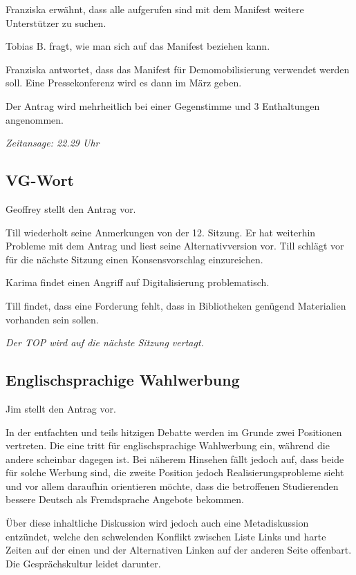 \documentclass[ngerman,headheight=70pt]{scrartcl}
\begin{document}
    Franziska erwähnt, dass alle aufgerufen sind mit dem Manifest weitere Unterstützer
    zu suchen.

    Tobias B. fragt, wie man sich auf das Manifest beziehen kann.

    Franziska antwortet, dass das Manifest für Demomobilisierung verwendet werden
    soll. Eine Pressekonferenz wird es dann im März geben.

    Der Antrag wird mehrheitlich bei einer Gegenstimme und 3 Enthaltungen
    angenommen.

    \textit{Zeitansage: 22.29 Uhr}
    \subsection{VG-Wort}

    Geoffrey stellt den Antrag vor.

    Till wiederholt seine Anmerkungen von der 12. Sitzung. Er hat weiterhin Probleme
    mit dem Antrag und liest seine Alternativversion vor. Till schlägt vor
    für die nächste Sitzung einen Konsensvorschlag einzureichen.

    Karima findet einen Angriff auf Digitalisierung problematisch.

    Till findet, dass eine Forderung fehlt, dass in Bibliotheken genügend
    Materialien vorhanden sein sollen.

    \textit{Der TOP wird auf die nächste Sitzung vertagt.}

    \subsection{Englischsprachige Wahlwerbung}

    Jim stellt den Antrag vor.

    In der entfachten und teils hitzigen Debatte werden im Grunde zwei Positionen
    vertreten. Die eine tritt für englischsprachige Wahlwerbung ein, während die
    andere scheinbar dagegen ist. Bei näherem Hinsehen fällt jedoch auf, dass
    beide für solche Werbung sind, die zweite Position jedoch Realisierungsprobleme
    sieht und vor allem daraufhin orientieren möchte, dass die betroffenen
    Studierenden bessere Deutsch als Fremdsprache Angebote bekommen.

    Über diese inhaltliche Diskussion wird jedoch auch eine Metadiskussion
    entzündet, welche den schwelenden Konflikt zwischen Liste Links und harte Zeiten
    auf der einen und der Alternativen Linken auf der anderen Seite offenbart.
    Die Gesprächskultur leidet darunter.
\end{document}
